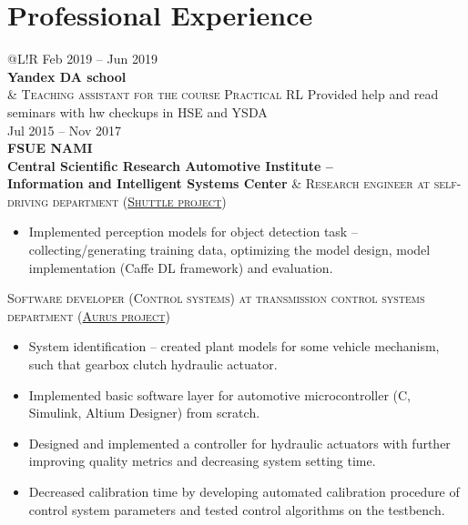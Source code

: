 \documentclass[10pt, a4paper]{extarticle}
\newcommand\boldgrey[1]{\textcolor{mygray}{\textbf{#1}}}
\newcommand\VRule{\color{lightgray}\vrule width 0.5pt}
\begin{document}
\section*{Professional Experience}
\begin{tabular}{@{}L!{\VRule}R}
    Feb 2019 -- Jun 2019                                                                                                       \\ {\boldgrey{Yandex DA school}} \\ &
    {\textsc{Teaching assistant for the course Practical RL}} Provided help and read seminars with hw checkups in HSE and YSDA \\
    Jul 2015 -- Nov 2017                                                                                                       \\ {\bf FSUE NAMI} \\ \boldgrey{Central Scientific Research Automotive Institute -- \\ Information and Intelligent Systems Center} &
    {\textsc{Research engineer at self-driving department (\href{https://www.engadget.com/2016/08/28/yandex-teams-on-self-driving-shuttle-bus/}{Shuttle project})}}
    \begin{itemize}
        \item Implemented perception models for object detection task -- collecting/generating training data, optimizing the model design, model implementation (Caffe DL framework) and evaluation.
    \end{itemize}
    \textsc{Software developer (Control systems) at transmission control systems department (\href{https://en.wikipedia.org/wiki/Aurus_Senat}{Aurus project})}
    \begin{itemize}
        \item System identification -- created plant models for some vehicle mechanism, such that gearbox clutch hydraulic actuator.
        \item Implemented basic software layer for automotive microcontroller (C, Simulink, Altium Designer) from scratch.
        \item Designed and implemented a controller for hydraulic actuators with further improving quality metrics and decreasing system setting time.
        \item Decreased calibration time by developing automated calibration procedure of control system parameters and tested control algorithms on the testbench.
    \end{itemize}                                                                                                  \\

\end{tabular}
\end{document}
